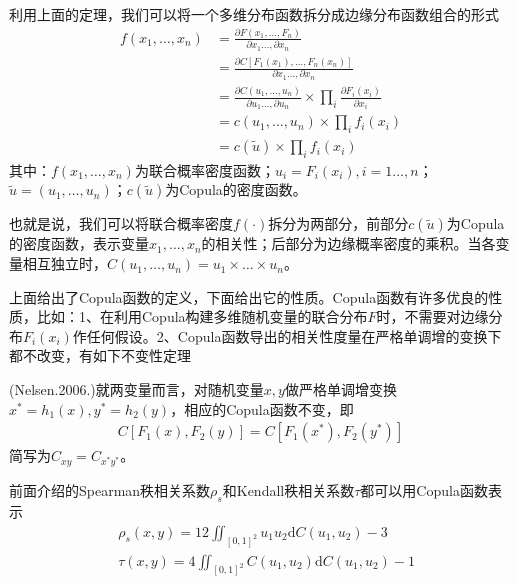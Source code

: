            \par
            利用上面的定理，我们可以将一个多维分布函数拆分成边缘分布函数组合的形式
            \begin{align*}
            f(x_1,\dots,x_n) &= \frac{\partial F(x_1,\dots,F_n)}{\partial x_1\dots,\partial x_n}\\
            &=\frac{\partial C[F_1(x_1),\dots,F_n(x_n)]}{\partial x_1\dots,\partial x_n}\\
            &=\frac{\partial C(u_1,\dots,u_n)}{\partial u_1\dots,\partial u_n}  \times \prod_i \frac{\partial F_i(x_i)}{\partial x_i}\\
            &=c(u_1,\dots,u_n) \times \prod_i f_i(x_i)\\
            &=c(\tilde{u}) \times \prod_i f_i(x_i)
            \end{align*}
            其中：$f(x_1,\dots,x_n)$为联合概率密度函数；$u_i = F_i(x_i),i = 1\dots,n$；$\tilde{u} = (u_1,\dots,u_n)$；$c(\tilde{u})$为Copula的密度函数。
            \par
            也就是说，我们可以将联合概率密度$f(\cdot)$拆分为两部分，前部分$c(\tilde{u})$为Copula的密度函数，表示变量$x_1,\dots,x_n$的相关性；后部分为边缘概率密度的乘积。当各变量相互独立时，$C(u_1,\dots,u_n) = u_1\times \dots \times u_n$。
            \par
            上面给出了Copula函数的定义，下面给出它的性质。Copula函数有许多优良的性质，比如：1、在利用Copula构建多维随机变量的联合分布$F$时，不需要对边缘分布$F_i(x_i)$作任何假设。2、Copula函数导出的相关性度量在严格单调增的变换下都不改变，有如下不变性定理
            \begin{theorem}[Copula不变性]
            (Nelsen.2006.)就两变量而言，对随机变量$x,y$做严格单调增变换$x^* = h_1(x),y^* = h_2(y)$，相应的Copula函数不变，即
            \begin{align*}
            C[F_1(x),F_2(y)] = C[F_1(x^*),F_2(y^*)]
            \end{align*}
            简写为$C_{xy} = C_{x^*y^*}$。
            \end{theorem}
            \par
            前面介绍的Spearman秩相关系数$\rho_s$和Kendall秩相关系数$\tau$都可以用Copula函数表示
            \begin{align*}
            &\rho_s(x,y) = 12\iint_{[0,1]^2}u_1u_2\mathrm{d}C(u_1,u_2) - 3\\
            &\tau(x,y) = 4 \iint_{[0,1]^2}C(u_1,u_2)\mathrm{d}C(u_1,u_2) - 1
            \end{align*}
